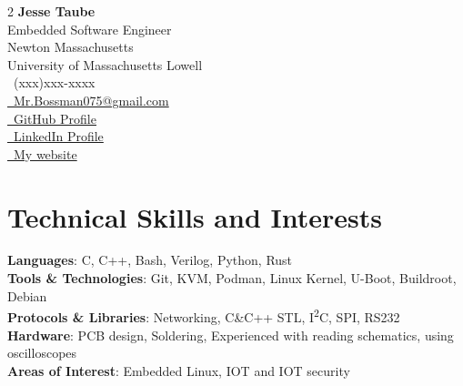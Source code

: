 \documentclass[a4paper,11pt]{article}
\makeatletter
\newcommand{\phone}{(xxx)xxx-xxxx}
\newcommand{\email}{Mr.Bossman075@gmail.com}
\makeatother
\begin{document}
\selectfont
{
\begin{multicols}{2}
	\textbf{\Large Jesse Taube} \\
	{{\footnotesize \faMicrochip} Embedded Software Engineer} \\
	{{\footnotesize \faMapMarker} Newton Massachusetts} \\
	{{\footnotesize \faGraduationCap} University of Massachusetts Lowell} \\
	\vfill\null
	\RaggedLeft
	{\raisebox{0.0\height}{\footnotesize \faPhone}\ \phone} \\
	{\href{mailto:\email}{\raisebox{0.0\height}{\footnotesize \faEnvelope}\ {\email}}} \\
	{\href{https://github.com/Mr-Bossman}{\raisebox{0.0\height}{\footnotesize \faGithub}\ {GitHub Profile}}} \\
	{\href{https://www.linkedin.com/in/jesse-taube-749351229/}{\raisebox{0.0\height}{\footnotesize \faLinkedin}\ {LinkedIn Profile}}} \\
	{\href{https://jachan.dev}{\raisebox{0.0\height}{\footnotesize \faGlobe}\ {My website}}}
\end{multicols}
}
\vspace{-3mm}

\section{\textbf{Technical Skills and Interests}}
\begin{itemize}[leftmargin=0.05in, label={}]
		\small{\item{
		 \textbf{Languages}{: C, C++, Bash, Verilog, Python, Rust} \\
		 \textbf{Tools \& Technologies}{: Git, KVM, Podman, Linux Kernel, U-Boot, Buildroot, Debian} \\
		 \textbf{Protocols \& Libraries}{: Networking, C\&C++ STL, I\textsuperscript{2}C, SPI, RS232}\\
		 \textbf{Hardware}{: PCB design, Soldering, Experienced with reading schematics, using oscilloscopes} \\
		 \textbf{Areas of Interest}{: Embedded Linux, IOT and IOT security} \\
		}}
\end{itemize}
\vspace{-16pt}
\end{document}
